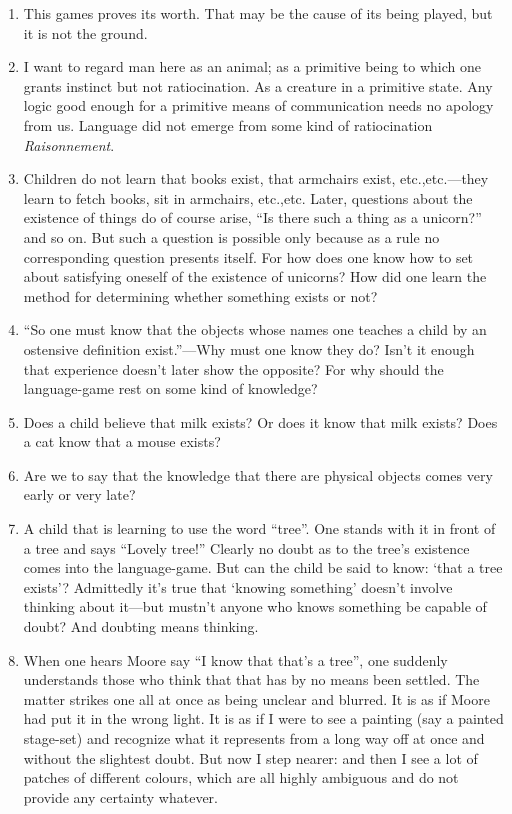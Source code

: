 \documentclass{book}
\begin{document}
\begin{enumerate}
\item
This games proves its worth. That may be the cause of its being played, but it
is not the ground.

\item
I want to regard man here as an animal; as a primitive being to which one
grants instinct but not ratiocination. As a creature in a primitive state. Any
logic good enough for a primitive means of communication needs no apology from
us. Language did not emerge from some kind of ratiocination
\emph{Raisonnement}.

\item
Children do not learn that books exist, that armchairs exist, etc.,etc.---they
learn to fetch books, sit in armchairs, etc.,etc.  Later, questions about the
existence of things do of course arise, ``Is there such a thing as a unicorn?''
and so on. But such a question is possible only because as a rule no
corresponding question presents itself. For how does one know how to set about
satisfying oneself of the existence of unicorns? How did one learn the method
for determining whether something exists or not?

\item
``So one must know that the objects whose names one teaches a child by an
ostensive definition exist.''---Why must one know they do? Isn't it enough that
experience doesn't later show the opposite?  For why should the language-game
rest on some kind of knowledge?

\item
Does a child believe that milk exists? Or does it know that milk exists? Does a
cat know that a mouse exists?

\item
Are we to say that the knowledge that there are physical objects comes very
early or very late?

\item
A child that is learning to use the word ``tree''. One stands with it in front
of a tree and says ``Lovely tree!'' Clearly no doubt as to the tree's existence
comes into the language-game. But can the child be said to know: `that a tree
exists'? Admittedly it's true that `knowing something' doesn't involve thinking
about it---but mustn't anyone who knows something be capable of doubt? And
doubting means thinking.

\item
When one hears Moore say ``I know that that's a tree'', one suddenly
understands those who think that that has by no means been settled.  The matter
strikes one all at once as being unclear and blurred. It is as if Moore had put
it in the wrong light.  It is as if I were to see a painting (say a painted
stage-set) and recognize what it represents from a long way off at once and
without the slightest doubt. But now I step nearer: and then I see a lot of
patches of different colours, which are all highly ambiguous and do not provide
any certainty whatever.


\end{enumerate}
\end{document}
